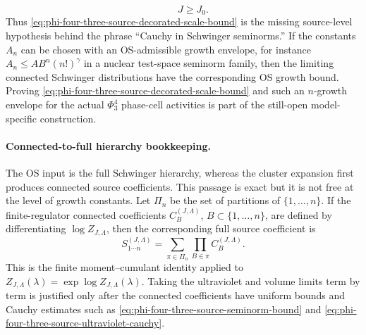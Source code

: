 \begin{construction}
\begin{equation}
  \qquad J\geq J_0 .
  \label{eq:phi-four-three-source-ultraviolet-cauchy}
\end{equation}
Thus \eqref{eq:phi-four-three-source-decorated-scale-bound} is the missing
source-level hypothesis behind the phrase ``Cauchy in Schwinger seminorms.''
If the constants \(A_n\) can be chosen with an OS-admissible growth envelope,
for instance \(A_n\leq A B^n(n!)^\gamma\) in a nuclear test-space seminorm
family, then the limiting connected Schwinger distributions have the
corresponding OS growth bound.  Proving
\eqref{eq:phi-four-three-source-decorated-scale-bound} and such an
\(n\)-growth envelope for the actual \(\Phi^4_3\) phase-cell activities is
part of the still-open model-specific construction.
\end{construction}

\paragraph{Connected-to-full hierarchy bookkeeping.}
The OS input is the full Schwinger hierarchy, whereas the cluster expansion
first produces connected source coefficients.  This passage is exact but it is
not free at the level of growth constants.  Let \(\Pi_n\) be the set of
partitions of \(\{1,\ldots,n\}\).  If the finite-regulator connected
coefficients \(C_B^{(J,\Lambda)}\), \(B\subset\{1,\ldots,n\}\), are defined by
differentiating \(\log Z_{J,\Lambda}\), then the corresponding full source
coefficient is
\begin{equation}
  S_{1\cdots n}^{(J,\Lambda)}
  =
  \sum_{\pi\in\Pi_n}
  \prod_{B\in\pi} C_B^{(J,\Lambda)} .
  \label{eq:phi-four-three-moment-cumulant-reconstruction}
\end{equation}
This is the finite moment--cumulant identity applied to
\(Z_{J,\Lambda}(\lambda)=\exp\log Z_{J,\Lambda}(\lambda)\).  Taking the
ultraviolet and volume limits term by term is justified only after the
connected coefficients have uniform bounds and Cauchy estimates such as
\eqref{eq:phi-four-three-source-seminorm-bound} and
\eqref{eq:phi-four-three-source-ultraviolet-cauchy}.

